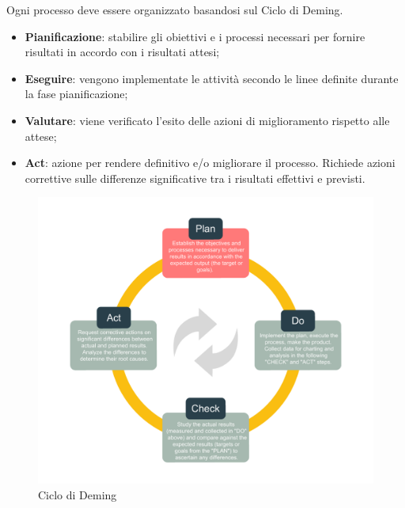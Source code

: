 Ogni processo deve essere organizzato basandosi sul Ciclo di Deming.
\begin{itemize}
	\item \textbf{Pianificazione}: stabilire gli obiettivi e i processi necessari per fornire risultati in accordo con i risultati attesi;
	\item \textbf{Eseguire}: vengono implementate le attività secondo le linee definite durante la fase pianificazione;
	\item \textbf{Valutare}: viene verificato l'esito delle azioni di miglioramento rispetto alle attese;
	\item \textbf{Act}: azione per rendere definitivo e/o migliorare il processo. Richiede azioni correttive sulle differenze significative tra i risultati effettivi e previsti.
\end{itemize}
\begin{figure}[H]
\centering
	\includegraphics[scale=.7]{img/PDCA.pdf} 
	\caption{Ciclo di Deming}	
\end{figure}